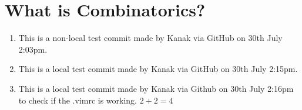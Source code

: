 %
%
% 


\chapter{What is Combinatorics?}
\begin{enumerate}
\item This is a non-local test commit made by Kanak via GitHub on 30th July 2:03pm.
\item This is a local test commit made by Kanak via GitHub on 30th July 2:15pm.
\item This is a local test commit made by Kanak via Github on 30th July 2:16pm to check if the .vimrc is working. $2+2=4$
\end{enumerate}















\endinput

